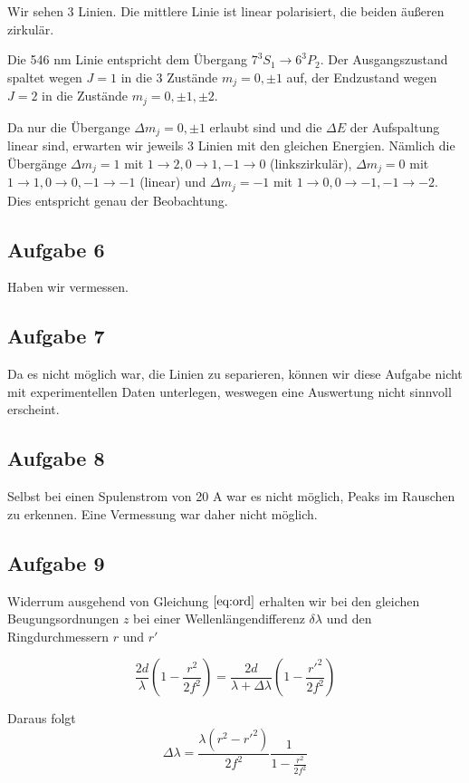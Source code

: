 \documentclass[a4paper,german,12pt,smallheadings]{scrartcl}
\begin{document}
Wir sehen 3 Linien. Die mittlere Linie ist linear polarisiert, die beiden
äußeren zirkulär.

Die 546 nm Linie entspricht dem Übergang $7^3S_1 \to 6^3P_2$. Der
Ausgangszustand spaltet wegen $J=1$ in die 3 Zustände $m_j = 0,\pm1$ auf, der
Endzustand wegen $J=2$ in die Zustände $m_j = 0,\pm1,\pm2$.

Da nur die Übergange $\Delta m_j = 0,\pm1$ erlaubt sind und die $\Delta E$ der
Aufspaltung linear sind, erwarten wir jeweils 3 Linien mit den gleichen
Energien. Nämlich die Übergänge $\Delta m_j = 1$ mit $1 \to 2, 0 \to 1, -1 \to
0$ (linkszirkulär), $\Delta m_j = 0$ mit $1 \to 1, 0 \to 0, -1 \to -1$ (linear)
und $\Delta m_j = -1$ mit $1 \to 0, 0 \to -1, -1 \to -2$. Dies entspricht genau
der Beobachtung.

\subsection{Aufgabe 6}
Haben wir vermessen.

\subsection{Aufgabe 7}
Da es nicht möglich war, die Linien zu separieren, können wir diese Aufgabe
nicht mit experimentellen Daten unterlegen, weswegen eine Auswertung nicht
sinnvoll erscheint.

\subsection{Aufgabe 8}
Selbst bei einen Spulenstrom von 20 A war es nicht möglich, Peaks im Rauschen
zu erkennen. Eine Vermessung war daher nicht möglich.

\subsection{Aufgabe 9}

Widerrum ausgehend von Gleichung $\ref{eq:ord}$ erhalten wir bei den gleichen
Beugungsordnungen $z$ bei einer Wellenlängendifferenz $\delta \lambda$ und den
Ringdurchmessern $r$ und $r'$

\begin{equation}
  \frac{2 d}{\lambda} \left(1 - \frac{r^2}{2f^2}\right) =
  \frac{2 d}{\lambda + \Delta \lambda} \left(1 - \frac{r'^2}{2f^2}\right)
\end{equation}

Daraus folgt
\begin{equation}
  \Delta \lambda = \frac{\lambda(r^2 - r'^2)}{2f^2} \frac{1}{1 - \frac{r^2}{2f^2}}
\end{equation}
\end{document}
